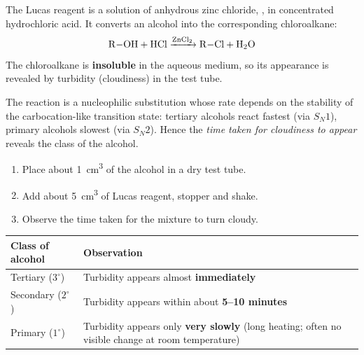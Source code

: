 \documentclass[11pt]{article}
\newcommand{\cle}[1]{{\popxbold\color{popdark}#1}}
\begin{document}
\begin{definition}
The \cle{Lucas reagent} is a solution of anhydrous zinc chloride, , in concentrated hydrochloric acid. It converts an alcohol into the corresponding chloroalkane:
\[ \ce{R-OH + HCl ->[ZnCl2] R-Cl + H2O} \]
The chloroalkane is \textbf{insoluble} in the aqueous medium, so its appearance is revealed by \cle{turbidity} (cloudiness) in the test tube.
\end{definition}

The reaction is a nucleophilic substitution whose rate depends on the stability of the carbocation-like transition state: tertiary alcohols react fastest (via \cle{$S_N1$}), primary alcohols slowest (via \cle{$S_N2$}). Hence the \emph{time taken for cloudiness to appear} reveals the class of the alcohol.

\begin{methode}
\begin{enumerate}
\item Place about \SI{1}{cm^3} of the alcohol in a dry test tube.
\item Add about \SI{5}{cm^3} of Lucas reagent, stopper and shake.
\item Observe the time taken for the mixture to turn cloudy.
\end{enumerate}
\begin{center}
\begin{tabularx}{\linewidth}{|l|X|}
\hline
\rowcolor{popblueL} \textbf{Class of alcohol} & \textbf{Observation} \\
\hline
Tertiary ($3^{\circ}$) & Turbidity appears almost \textbf{immediately} \\
\hline
Secondary ($2^{\circ}$) & Turbidity appears within about \textbf{5--10 minutes} \\
\hline
Primary ($1^{\circ}$) & Turbidity appears only \textbf{very slowly} (long heating; often no visible change at room temperature) \\
\hline
\end{tabularx}
\end{center}
\end{methode}
\end{document}
